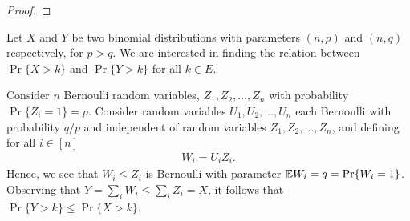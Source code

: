 \documentclass[a4paper,10pt,english]{article}
\begin{document}
\begin{proof}
\end{proof}
\begin{shaded*}
Let $X$ and $Y$ be two binomial distributions with parameters $(n,p)$ and $(n,q)$ respectively, for $p > q$. 
We are interested in finding the relation between $\Pr\{X > k\}$ and $\Pr\{Y > k\}$  for all $k \in E$. 

Consider $n$ Bernoulli random variables, $Z_1,Z_2, \ldots,Z_n$ with probability $\Pr\{Z_i = 1\} = p$. 
Consider random variables $U_1, U_2, \ldots, U_n$ each Bernoulli with probability $q/p$ and independent of random variables $Z_1,Z_2, \ldots, Z_n$, and defining for all $i \in [n]$
\begin{align*}
W_i = U_iZ_i.
\end{align*}
Hence, we see that $W_i \leq Z_i$ is Bernoulli with parameter $\mathbb{E} W_i = q = \Pr\{W_i = 1\}$.
Observing that $Y = \sum_i W_i \leq \sum_i Z_i  = X$, it follows that $\Pr\{Y > k\} \leq  \Pr\{X > k\}$. 
\end{shaded*}
\end{document}
